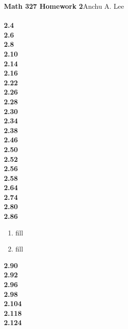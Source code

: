 \documentclass{article}
\begin{document}
    \noindent\textbf{Math 327 Homework 2}\hfill Anchu A. Lee\\\\
    
    \noindent\textbf{2.4}\\
    \textbf{2.6}\\
    \textbf{2.8}\\
    \textbf{2.10}\\
    \textbf{2.14}\\
    \textbf{2.16}\\
    \textbf{2.22}\\
    \textbf{2.26}\\
    \textbf{2.28}\\
    \textbf{2.30}\\
    \textbf{2.34}\\
    \textbf{2.38}\\
    \textbf{2.46}\\
    \textbf{2.50}\\
    \textbf{2.52}\\
    \textbf{2.56}\\
    \textbf{2.58}\\
    \textbf{2.64}\\
    \textbf{2.74}\\
    \textbf{2.80}\\
    \textbf{2.86}
    \begin{enumerate}
        \item fill
        \item fill
    \end{enumerate}
    \textbf{2.90}\\
    \textbf{2.92}\\
    \textbf{2.96}\\
    \textbf{2.98}\\
    \textbf{2.104}\\
    \textbf{2.118}\\
    \textbf{2.124}\\
    
\end{document}

